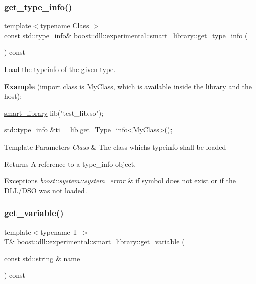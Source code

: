 \subsubsection{\texorpdfstring{get\+\_\+type\+\_\+info()}{get\_type\_info()}}
{\footnotesize\ttfamily template$<$typename Class $>$ \\
const std\+::type\+\_\+info\& boost\+::dll\+::experimental\+::smart\+\_\+library\+::get\+\_\+type\+\_\+info (\begin{DoxyParamCaption}{ }\end{DoxyParamCaption}) const\hspace{0.3cm}{\ttfamily [inline]}}

Load the typeinfo of the given type.

{\bfseries Example} (import class is My\+Class, which is available inside the library and the host)\+:


\begin{DoxyCode}
\hyperlink{a01712_af1fa4c4ed871e889f92f4c11d574d91f}{smart\_library} lib(\textcolor{stringliteral}{"test\_lib.so"});

std::type\_info &ti = lib.get\_Type\_info<MyClass>();
\end{DoxyCode}



\begin{DoxyTemplParams}{Template Parameters}
{\em Class} & The class whichs typeinfo shall be loaded \\
\hline
\end{DoxyTemplParams}
\begin{DoxyReturn}{Returns}
A reference to a type\+\_\+info object.
\end{DoxyReturn}

\begin{DoxyExceptions}{Exceptions}
{\em boost\+::system\+::system\+\_\+error} & if symbol does not exist or if the D\+L\+L/\+D\+SO was not loaded. \\
\hline
\end{DoxyExceptions}
\mbox{\label{a01712_a1dff6c89b818955195b7e40bbdf33478}} 
\subsubsection{\texorpdfstring{get\+\_\+variable()}{get\_variable()}}
{\footnotesize\ttfamily template$<$typename T $>$ \\
T\& boost\+::dll\+::experimental\+::smart\+\_\+library\+::get\+\_\+variable (\begin{DoxyParamCaption}\item[{const std\+::string \&}]{name }\end{DoxyParamCaption}) const\hspace{0.3cm}{\ttfamily [inline]}}

